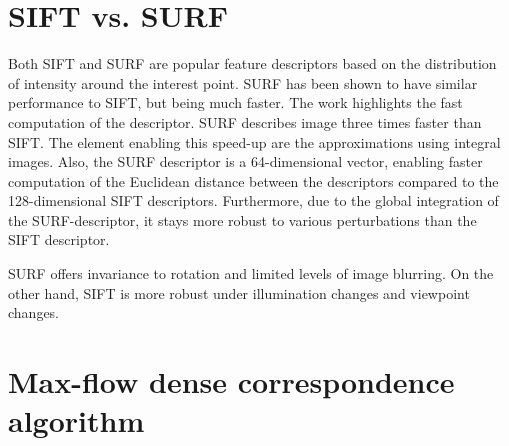 \section{SIFT vs. SURF}
Both SIFT and SURF are popular feature descriptors based on the distribution of intensity around the interest point.
SURF has been shown to have similar performance to SIFT, but being much faster. 
The work \cite{surf2006} highlights the fast computation of the descriptor.
SURF describes image three times faster than SIFT. 
The element enabling this speed-up are the approximations using integral images. 
Also, the SURF descriptor is a 64-dimensional vector, enabling faster computation of the Euclidean distance between the descriptors compared to the 128-dimensional SIFT descriptors. %
Furthermore, due to the global integration of the SURF-descriptor, it stays more robust to various perturbations than the SIFT descriptor. 

SURF offers invariance to rotation and limited levels of image blurring.
On the other hand, SIFT is more robust under illumination changes and viewpoint changes. 

\section{Max-flow dense correspondence algorithm}


